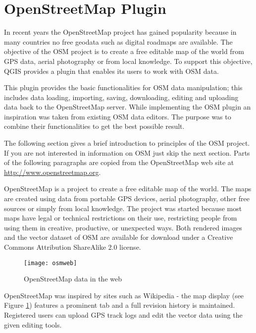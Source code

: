 
\section{OpenStreetMap Plugin}\label{plugins_osm}


In recent years the OpenStreetMap project has gained popularity because in many countries no free geodata such as digital roadmaps are available.
The objective of the OSM project is to create a free editable map of the world from GPS data, aerial photography or from local knowledge. To
support this objective, QGIS provides a plugin that enables its users to work with OSM data.

This plugin provides the basic functionalities for OSM data manipulation; this includes data loading, importing, saving, downloading, editing and
uploading data back to the OpenStreetMap server. While implementing the OSM plugin an inspiration was taken from existing OSM data editors. The
purpose was to combine their functionalities to get the best possible result.

The following section gives a brief introduction to principles of the OSM project. If you are not interested in information on OSM just skip the next
section. Parts of the following paragraphs are copied from the OpenStreetMap web site at \url{http://www.openstreetmap.org}.


OpenStreetMap is a project to create a free editable map of the world. The maps are created using data from portable GPS devices, aerial photography,
other free sources or simply from local knowledge. The project was started because most maps have legal or technical restrictions on their use, restricting people from using them in creative, productive, or unexpected ways. Both rendered images and the vector dataset of OSM are available for download under a Creative Commons Attribution ShareAlike 2.0 license.

\begin{figure}[ht]
   \centering
   \texttt{[image: osmweb]}
   \caption{OpenStreetMap data in the web \nixcaption}\label{fig:osmweb}
\end{figure}

OpenStreetMap was inspired by sites such as Wikipedia - the map display
(see Figure \ref{fig:osmweb}) features a prominent  tab and a
full revision history is maintained. Registered users can upload GPS track
logs and edit the vector data using the given editing tools.

